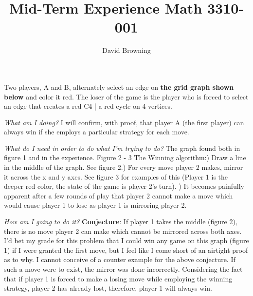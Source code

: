 \documentclass[12pt]{article}
\newenvironment{sub}[2][Sub-Experience]{\begin{trivlist}
\item[\hskip \labelsep {\bfseries #1}\hskip \labelsep {\bfseries #2.}]}{\end{trivlist}}
\begin{document}
 
 
\title{Mid-Term Experience Math 3310-001}
\author{David Browning}
\maketitle
 
\begin{sub}{1. The Game}Two players, A and B, alternately select an edge on \textbf{the grid graph shown below} and color it red. The loser of the game is the player who is forced to select an edge that creates a red C4 | a red cycle on 4 vertices.

\end{sub}


\textit{What am I doing?}\newline
I will confirm, with proof, that player A (the first player) can always win if she employs a particular strategy for each move.\newline

\textit{What do I need in order to do what I'm trying to do?}\newline
The graph found both in figure 1 and in the experience. \newline
Figure 2 - 3\newline
The Winning algorithm:) Draw a line in the middle of the graph. See figure 2.) For every move player 2 makes, mirror it across the x and y axes. See figure 3 for examples of this (Player 1 is the deeper red color, the state of the game is player 2's turn). ) It becomes painfully apparent after a few rounds of play that player 2 cannot make a move which would cause player 1 to lose as player 1 is mirroring player 2. \newline

\textit{How am I going to do it?}\newline
\textbf{Conjecture}: If player 1 takes the middle (figure 2), there is no move player 2 can make which cannot be mirrored across both axes. \newline 
I'd bet my grade for this problem that I could win any game on this graph (figure 1) if I were granted the first move, but I feel like I come short of an airtight proof as to why. I cannot conceive of a counter example for the above conjecture. If such a move were to exist, the mirror was done incorrectly. Considering the fact that if player 1 is forced to make a losing move while employing the winning strategy, player 2 has already lost, therefore, player 1 will always win.
\end{document}
